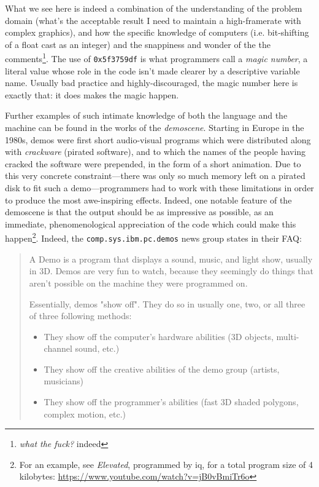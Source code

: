 What we see here is indeed a combination of the understanding of the problem domain (what's the acceptable result I need to maintain a high-framerate with complex graphics), and how the specific knowledge of computers (i.e. bit-shifting of a float cast as an integer) and the snappiness and wonder of the the comments\footnote{\emph{what the fuck?} indeed}. The use of \lstinline{0x5f3759df} is what programmers call a \emph{magic number}, a literal value whose role in the code isn't made clearer by a descriptive variable name. Usually bad practice and highly-discouraged, the magic number here is exactly that: it does makes the magic happen.

Further examples of such intimate knowledge of both the language and the machine can be found in the works of the \emph{demoscene}. Starting in Europe in the 1980s, demos were first short audio-visual programs which were distributed along with \emph{crackware} (pirated software), and to which the names of the people having cracked the software were prepended, in the form of a short animation\cite{reunanen_computer_2010}. Due to this very concrete constraint—there was only so much memory left on a pirated disk to fit such a demo—programmers had to work with these limitations in order to produce the most awe-inspiring effects. Indeed, one notable feature of the demoscene is that the output should be as impressive as possible, as an immediate, phenomenological appreciation of the code which could make this happen\footnote{For an example, see \emph{Elevated}, programmed by iq, for a total program size of 4 kilobytes: \url{https://www.youtube.com/watch?v=jB0vBmiTr6o}}. Indeed, the \lstinline{comp.sys.ibm.pc.demos} news group states in their FAQ:

\begin{quote}
  A Demo is a program that displays a sound, music, and light show, usually in 3D. Demos are very fun to watch, because they seemingly do things that aren't possible on the machine they were programmed on.

  Essentially, demos "show off". They do so in usually one, two, or all three of three following methods:

  \begin{itemize}
    \item They show off the computer's hardware abilities (3D objects, multi-channel sound, etc.)
    \item They show off the creative abilities of the demo group (artists, musicians)
    \item They show off the programmer's abilities (fast 3D shaded polygons, complex motion, etc.)\cite{melik_pc_2012}
  \end{itemize}
\end{quote}

